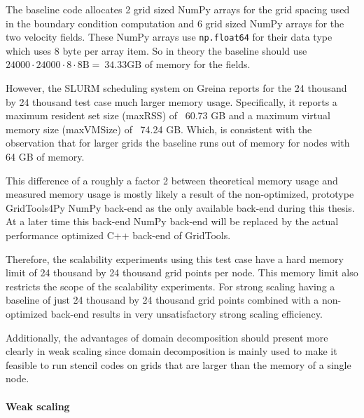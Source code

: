 The baseline code allocates 2 grid sized NumPy arrays for the grid spacing used in the boundary condition computation and 6 grid sized NumPy arrays for the two velocity fields.
These NumPy arrays use \texttt{np.float64} for their data type which uses 8 byte per array item.
So in theory the baseline should use $24000 \cdot 24000 \cdot 8 \cdot 8 \text{B} = ~34.33 \text{GB}$ of memory for the fields.

However, the SLURM scheduling system on Greina reports for the 24 thousand by 24 thousand test case much larger memory usage.
Specifically, it reports a maximum resident set size (maxRSS) of ~60.73 GB and a maximum virtual memory size (maxVMSize) of ~74.24 GB.
Which, is consistent with the observation that for larger grids the baseline runs out of memory for nodes with 64 GB of memory.

This difference of a roughly a factor 2 between theoretical memory usage and measured memory usage is mostly likely a result of the non-optimized, prototype GridTools4Py NumPy back-end as the only available back-end during this thesis.
At a later time this back-end NumPy back-end will be replaced by the actual performance optimized C++ back-end of GridTools.

Therefore, the scalability experiments using this test case have a hard memory limit of 24 thousand by 24 thousand grid points per node.
This memory limit also restricts the scope of the scalability experiments.
For strong scaling having a baseline of just 24 thousand by 24 thousand grid points combined with a non-optimized back-end results in very unsatisfactory strong scaling efficiency.

Additionally, the advantages of domain decomposition should present more clearly in weak scaling since domain decomposition is mainly used to make it feasible to run stencil codes on grids that are larger than the memory of a single node.

\paragraph{Weak scaling}

